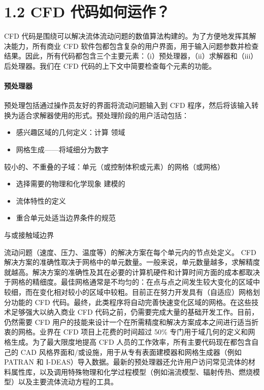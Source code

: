 \documentclass[11pt,a4paper,openany,fontset=none]{ctexbook}
\begin{document}
\section*{1.2 CFD 代码如何运作？}

CFD 代码是围绕可以解决流体流动问题的数值算法构建的。为了方便地发挥其解决能力，所有商业 CFD 软件包都包含复杂的用户界面，用于输入问题参数并检查结果。因此，所有代码都包含三个主要元素：（i）预处理器，（ii）求解器和（iii）后处理器。我们在 CFD 代码的上下文中简要检查每个元素的功能。

\paragraph{预处理器}

预处理包括通过操作员友好的界面将流动问题输入到 CFD 程序，然后将该输入转换为适合求解器使用的形式。预处理阶段的用户活动包括：

\begin{itemize}

\item 感兴趣区域的几何定义：计算 领域

\item 网格生成——将域细分为数字

\end{itemize}

较小的、不重叠的子域：单元（或控制体积或元素）的网格（或网格）

\begin{itemize}

\item 选择需要的物理和化学现象 建模的

\item 流体特性的定义

\item 重合单元处适当边界条件的规范

\end{itemize}

与或接触域边界

流动问题（速度、压力、温度等）的解决方案在每个单元内的节点处定义。 CFD 解决方案的准确性取决于网格中的单元数量。一般来说，单元数量越多，求解精度就越高。解决方案的准确性及其在必要的计算机硬件和计算时间方面的成本都取决于网格的精细度。最佳网格通常是不均匀的：在点与点之间发生较大变化的区域中较细，而在变化相对较小的区域中较粗。目前正在努力开发具有（自适应）网格划分功能的 CFD 代码。最终，此类程序将自动完善快速变化区域的网格。在这些技术足够强大以纳入商业 CFD 代码之前，仍需要完成大量的基础开发工作。目前，仍然需要 CFD 用户的技能来设计一个在所需精度和解决方案成本之间进行适当折衷的网格。业界在 CFD 项目上花费的时间超过 50\% 专门用于域几何的定义和网格生成。为了最大限度地提高 CFD 人员的工作效率，所有主要代码现在都包含自己的 CAD 风格界面和/或设施，用于从专有表面建模器和网格生成器（例如 PATRAN 和 I-DEAS）导入数据。最新的预处理器还允许用户访问常见流体的材料属性库，以及调用特殊物理和化学过程模型（例如湍流模型、辐射传热、燃烧模型）以及主要流体流动方程的工具。
\end{document}
